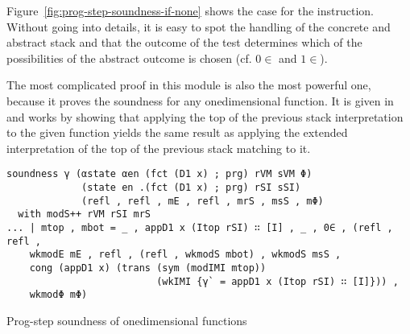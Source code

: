 Figure~\autoref{fig:prog-step-soundness-if-none} shows the case for
the  instruction. Without going into details, it is easy
to spot the handling of the concrete and abstract stack and that the
outcome of the test determines which of the possibilities of the
abstract outcome is chosen (cf. $0\in$ and $1\in$).


The most complicated proof in this module is also the most powerful one, because it proves
the soundness for any onedimensional function.
It is given in  and works by showing that applying the top of the previous
stack interpretation to the given function yields the same result as applying
the extended interpretation of the top of the previous stack matching to it.

\begin{listing}[!ht]
\begin{verbatim}
soundness γ (αstate αen (fct (D1 x) ; prg) rVM sVM Φ)
             (state en .(fct (D1 x) ; prg) rSI sSI)
             (refl , refl , mE , refl , mrS , msS , mΦ)
  with modS++ rVM rSI mrS
... | mtop , mbot = _ , appD1 x (Itop rSI) ∷ [I] , _ , 0∈ , (refl , refl ,
    wkmodE mE , refl , (refl , wkmodS mbot) , wkmodS msS ,
    cong (appD1 x) (trans (sym (modIMI mtop))
                          (wkIMI {γ` = appD1 x (Itop rSI) ∷ [I]})) ,
    wkmodΦ mΦ)
\end{verbatim}
\caption{Prog-step soundness of onedimensional functions}
\label{ps-sound-D1}
\end{listing}

